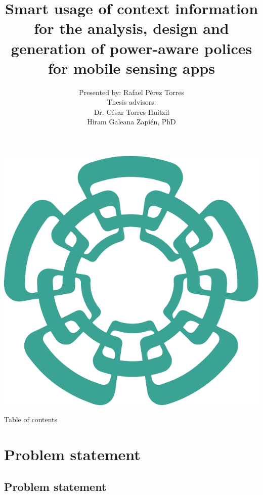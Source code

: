 \documentclass[compress,9pt,xcolor={dvipsnames,table}]{beamer}
\title[Smart usage of context information for the analysis, design and generation of power-aware polices for mobile sensing apps]{Smart usage of context information for the analysis, design and generation of power-aware polices for mobile sensing apps}
\author[Rafael Pérez Torres]{Presented by: Rafael Pérez Torres\\[0.5cm] Thesis advisors:\\Dr. César Torres Huitzil\\Hiram Galeana Zapién, PhD}
\institute{LTI Cinvestav Tamaulipas}
\date{}
\begin{document}
\begin{frame}[plain]
  \begin{center}
  \includegraphics[scale=0.12]{../../../resources/images/vectors/cinvestav-logo-no-text}
  \end{center}
  \titlepage
  
\end{frame}


\begin{frame}{Table of contents}
	\tableofcontents[hideallsubsections]
\end{frame}

\section{Problem statement}
\subsection{Problem statement}
\end{document}
